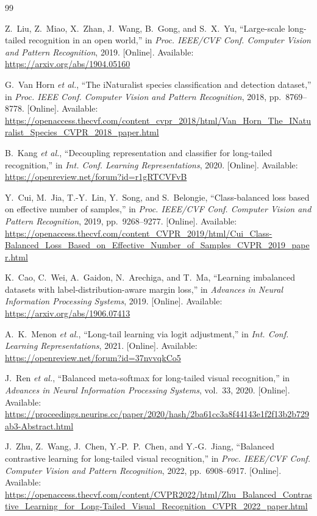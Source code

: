 \documentclass[conference]{IEEEtran}
\begin{document}
\begin{thebibliography}{99}

Z.~Liu, Z.~Miao, X.~Zhan, J.~Wang, B.~Gong, and S.~X.~Yu,
``Large-scale long-tailed recognition in an open world,'' in \emph{Proc. IEEE/CVF Conf. Computer Vision and Pattern Recognition}, 2019. [Online]. Available: \url{https://arxiv.org/abs/1904.05160}

G.~Van Horn \emph{et al.}, ``The iNaturalist species classification and detection dataset,'' in \emph{Proc. IEEE Conf. Computer Vision and Pattern Recognition}, 2018, pp.~8769--8778. [Online]. Available: \url{https://openaccess.thecvf.com/content_cvpr_2018/html/Van_Horn_The_INaturalist_Species_CVPR_2018_paper.html}

B.~Kang \emph{et al.}, ``Decoupling representation and classifier for long-tailed recognition,'' in \emph{Int. Conf. Learning Representations}, 2020. [Online]. Available: \url{https://openreview.net/forum?id=r1gRTCVFvB}

Y.~Cui, M.~Jia, T.-Y.~Lin, Y.~Song, and S.~Belongie, ``Class-balanced loss based on effective number of samples,'' in \emph{Proc. IEEE/CVF Conf. Computer Vision and Pattern Recognition}, 2019, pp.~9268--9277. [Online]. Available: \url{https://openaccess.thecvf.com/content_CVPR_2019/html/Cui_Class-Balanced_Loss_Based_on_Effective_Number_of_Samples_CVPR_2019_paper.html}

K.~Cao, C.~Wei, A.~Gaidon, N.~Arechiga, and T.~Ma, ``Learning imbalanced datasets with label-distribution-aware margin loss,'' in \emph{Advances in Neural Information Processing Systems}, 2019. [Online]. Available: \url{https://arxiv.org/abs/1906.07413}

A.~K.~Menon \emph{et al.}, ``Long-tail learning via logit adjustment,'' in \emph{Int. Conf. Learning Representations}, 2021. [Online]. Available: \url{https://openreview.net/forum?id=37nvvqkCo5}

J.~Ren \emph{et al.}, ``Balanced meta-softmax for long-tailed visual recognition,'' in \emph{Advances in Neural Information Processing Systems}, vol.~33, 2020. [Online]. Available: \url{https://proceedings.neurips.cc/paper/2020/hash/2ba61cc3a8f44143e1f2f13b2b729ab3-Abstract.html}

J.~Zhu, Z.~Wang, J.~Chen, Y.-P.~P.~Chen, and Y.-G.~Jiang, ``Balanced contrastive learning for long-tailed visual recognition,'' in \emph{Proc. IEEE/CVF Conf. Computer Vision and Pattern Recognition}, 2022, pp.~6908--6917. [Online]. Available: \url{https://openaccess.thecvf.com/content/CVPR2022/html/Zhu_Balanced_Contrastive_Learning_for_Long-Tailed_Visual_Recognition_CVPR_2022_paper.html}


\end{thebibliography}
\end{document}
